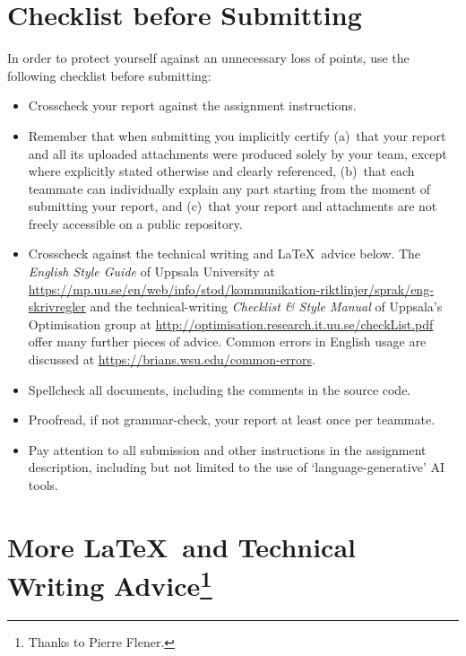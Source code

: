 \newpage
\section*{Checklist before Submitting}

In order to protect yourself against an unnecessary loss of points,
use the following checklist before submitting:
\begin{itemize}
\item Crosscheck your report against the assignment instructions.
\item {\color{red}Remember that when submitting you implicitly certify
    (a)~that your report and all its uploaded attachments were
    produced solely by your team, except where explicitly stated
    otherwise and clearly referenced, (b)~that each teammate can
    individually explain any part starting from the moment of
    submitting your report, and (c)~that your report and attachments
    are not freely accessible on a public repository.}
\item Crosscheck against the technical writing and \LaTeX\ advice
  below.  The \emph{English Style Guide} of Uppsala University at
  \url{https://mp.uu.se/en/web/info/stod/kommunikation-riktlinjer/sprak/eng-skrivregler}
  and the technical-writing \emph{Checklist \& Style Manual} of
  Uppsala's Optimisation group at
  \url{http://optimisation.research.it.uu.se/checkList.pdf} offer many
  further pieces of advice.  Common errors in English usage are
  discussed at \url{https://brians.wsu.edu/common-errors}.
\item Spellcheck all documents, including the comments in the source
  code.
\item Proofread, if not grammar-check, your report at least once per
  teammate.
\item Pay attention to all submission and other instructions in the assignment description, including but not limited to the use of `language-generative' AI tools.  
\end{itemize}

\section*{More \LaTeX\ and Technical Writing Advice\protect\footnote{Thanks to Pierre Flener.}}


